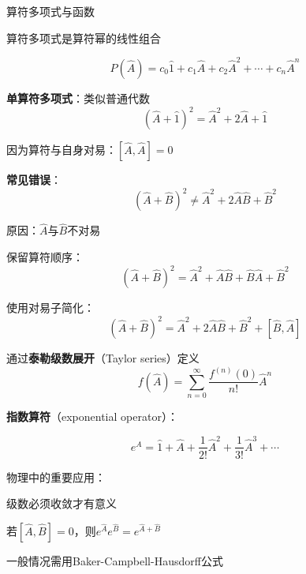\documentclass[aspectratio=169, 10pt]{beamer}
\begin{document}
\begin{frame}{算符多项式与函数}
  
  
  \begin{iqbitemize}
    \item 算符多项式是算符幂的线性组合
    \end{iqbitemize}
      \[
        P(\hat{A}) = c_0\hat{1} + c_1\hat{A} + c_2\hat{A}^2 + \cdots + c_n\hat{A}^n
      \]
    \begin{iqbitemize}
    \item \textbf{单算符多项式}：类似普通代数
    \[
      (\hat{A} + \hat{1})^2 = \hat{A}^2 + 2\hat{A} + \hat{1}
    \]
    \item 因为算符与自身对易：$[\hat{A}, \hat{A}] = 0$
    \end{iqbitemize}
    \iqbsmallsep

    \begin{iqbitemize}
    \item \textbf{常见错误}：
    \[
      (\hat{A} + \hat{B})^2 \neq \hat{A}^2 + 2\hat{A}\hat{B} + \hat{B}^2
    \]
    \item 原因：$\hat{A}$与$\hat{B}$不对易
    \end{iqbitemize}
    \iqbtinysep

    \begin{iqbitemize}
    \item 保留算符顺序：
    \[
      (\hat{A} + \hat{B})^2 = \hat{A}^2 + \hat{A}\hat{B} + \hat{B}\hat{A} + \hat{B}^2
    \]
    \item 使用对易子简化：
    \[
      (\hat{A} + \hat{B})^2 = \hat{A}^2 + 2\hat{A}\hat{B} + \hat{B}^2 + [\hat{B}, \hat{A}]
    \]
    \end{iqbitemize}
    \begin{iqbitemize}
    \item 通过\textbf{泰勒级数展开}（Taylor series）定义
    \[
      f(\hat{A}) = \sum_{n=0}^{\infty} \dfrac{f^{(n)}(0)}{n!}\hat{A}^n
    \]
    \item \textbf{指数算符}（exponential operator）：
    \end{iqbitemize}
      \[
        e^{\hat{A}} = \hat{1} + \hat{A} + \dfrac{1}{2!}\hat{A}^2 + \dfrac{1}{3!}\hat{A}^3 + \cdots
      \]
    \begin{iqbitemize}
    \item 物理中的重要应用：
    \end{iqbitemize}
    \iqbsmallsep

    \begin{iqbitemize}
    \item 级数必须收敛才有意义
    \item 若$[\hat{A}, \hat{B}] = 0$，则$e^{\hat{A}}e^{\hat{B}} = e^{\hat{A}+\hat{B}}$
    \item 一般情况需用Baker-Campbell-Hausdorff公式
    \end{iqbitemize}

\end{frame}
\end{document}
